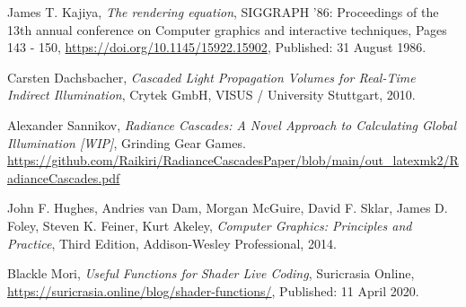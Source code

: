 \documentclass[sigconf, nonacm]{acmart}
\begin{document}
\begin{thebibliography}{9}
    James T. Kajiya, \textit{The rendering equation}, SIGGRAPH '86: Proceedings of the 13th annual conference on Computer graphics and interactive techniques, Pages 143 - 150, \url{https://doi.org/10.1145/15922.15902}, Published: 31 August 1986.
    
    Carsten Dachsbacher, \textit{Cascaded Light Propagation Volumes for Real-Time Indirect Illumination}, Crytek GmbH, VISUS / University Stuttgart, 2010.

    Alexander Sannikov, \textit{Radiance Cascades: A Novel Approach to Calculating Global Illumination [WIP]}, Grinding Gear Games. \url{https://github.com/Raikiri/RadianceCascadesPaper/blob/main/out_latexmk2/RadianceCascades.pdf}

    John F. Hughes, Andries van Dam, Morgan McGuire, David F. Sklar, James D. Foley, Steven K. Feiner, Kurt Akeley, \textit{Computer Graphics: Principles and Practice}, Third Edition, Addison-Wesley Professional, 2014.

    Blackle Mori, \textit{Useful Functions for Shader Live Coding}, Suricrasia Online, \url{https://suricrasia.online/blog/shader-functions/}, Published: 11 April 2020.

\end{thebibliography}




\end{document}
